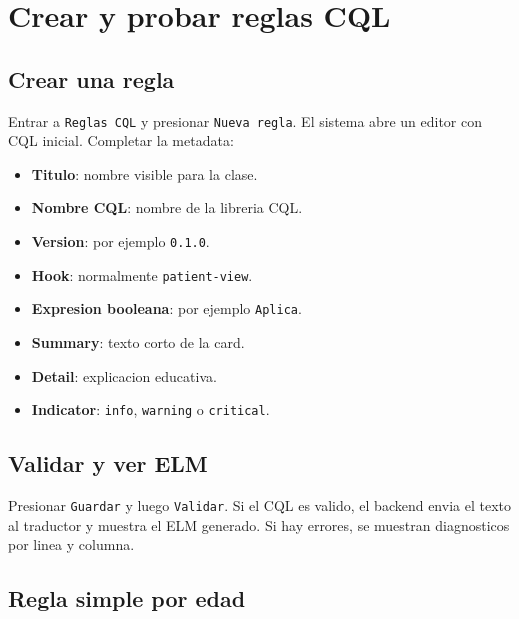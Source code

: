 \section{Crear y probar reglas CQL}

\subsection{Crear una regla}

Entrar a \texttt{Reglas CQL} y presionar \texttt{Nueva regla}. El sistema abre
un editor con CQL inicial. Completar la metadata:

\begin{itemize}
  \item \textbf{Titulo}: nombre visible para la clase.
  \item \textbf{Nombre CQL}: nombre de la libreria CQL.
  \item \textbf{Version}: por ejemplo \texttt{0.1.0}.
  \item \textbf{Hook}: normalmente \texttt{patient-view}.
  \item \textbf{Expresion booleana}: por ejemplo \texttt{Aplica}.
  \item \textbf{Summary}: texto corto de la card.
  \item \textbf{Detail}: explicacion educativa.
  \item \textbf{Indicator}: \texttt{info}, \texttt{warning} o \texttt{critical}.
\end{itemize}


\subsection{Validar y ver ELM}

Presionar \texttt{Guardar} y luego \texttt{Validar}. Si el CQL es valido, el
backend envia el texto al traductor y muestra el ELM generado. Si hay errores,
se muestran diagnosticos por linea y columna.


\subsection{Regla simple por edad}

